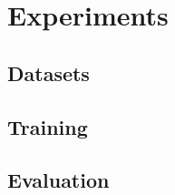 \chapter{Experiments} \label{chapter:experiments}

\section{Datasets}

\section{Training}

\section{Evaluation}